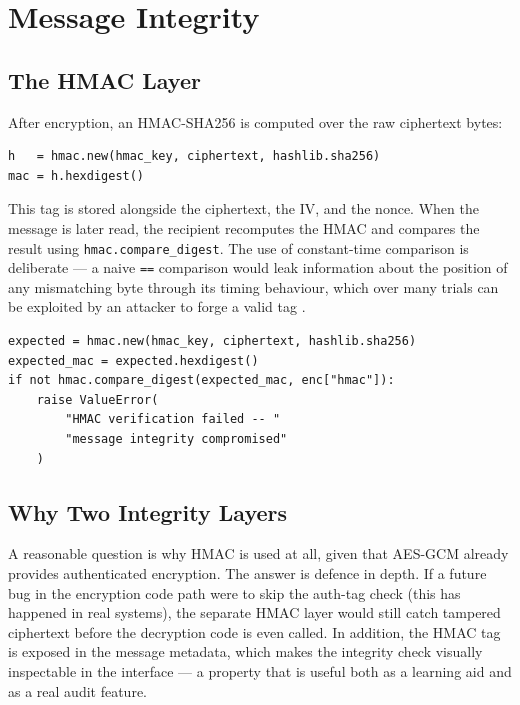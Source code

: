 \documentclass[conference]{IEEEtran}
\begin{document}
\section{Message Integrity}
\label{sec:integrity}

\subsection{The HMAC Layer}
After encryption, an HMAC-SHA256 is computed over the raw ciphertext bytes:

\begin{lstlisting}[caption={HMAC computation over the ciphertext.}]
h   = hmac.new(hmac_key, ciphertext, hashlib.sha256)
mac = h.hexdigest()
\end{lstlisting}

This tag is stored alongside the ciphertext, the IV, and the nonce. When the message is later read, the recipient recomputes the HMAC and compares the result using \texttt{hmac.compare\_digest}. The use of constant-time comparison is deliberate --- a naive \texttt{==} comparison would leak information about the position of any mismatching byte through its timing behaviour, which over many trials can be exploited by an attacker to forge a valid tag \cite{kocher1996timing}.

\begin{lstlisting}[caption={Constant-time HMAC verification.}]
expected = hmac.new(hmac_key, ciphertext, hashlib.sha256)
expected_mac = expected.hexdigest()
if not hmac.compare_digest(expected_mac, enc["hmac"]):
    raise ValueError(
        "HMAC verification failed -- "
        "message integrity compromised"
    )
\end{lstlisting}

\subsection{Why Two Integrity Layers}
A reasonable question is why HMAC is used at all, given that AES-GCM already provides authenticated encryption. The answer is defence in depth. If a future bug in the encryption code path were to skip the auth-tag check (this has happened in real systems), the separate HMAC layer would still catch tampered ciphertext before the decryption code is even called. In addition, the HMAC tag is exposed in the message metadata, which makes the integrity check visually inspectable in the interface --- a property that is useful both as a learning aid and as a real audit feature.
\end{document}
